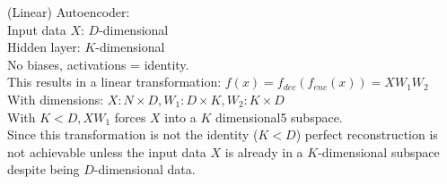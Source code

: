 %
%
%
%
%
%
\begin{flushleft}
(Linear) Autoencoder:
\\
Input data $X$: $D$-dimensional\\
Hidden layer: $K$-dimensional\\
No biases, activations = identity.\\
This results in a linear transformation: $f(x) = f_{dec}(f_{enc}(x))= X W_1 W_2$\\
With dimensions: $X: N \times D, W_1: D \times K, W_2: K \times D$\\
With $K < D, X W_1$ forces $X$ into a $K$ dimensional5 subspace.\\
Since this transformation is not the identity ($K < D$) perfect reconstruction is
not achievable unless the input data $X$ is already in a $K$-dimensional 
subspace despite being $D$-dimensional data.
\\
\end{flushleft}
%
%
%
